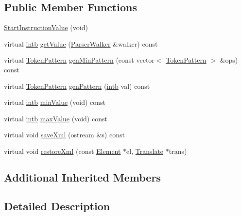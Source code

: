\subsection*{Public Member Functions}
\begin{DoxyCompactItemize}
\item 
\mbox{\hyperlink{class_start_instruction_value_a664ffdbfc8c447d445d24350a67a02b3}{Start\+Instruction\+Value}} (void)
\item 
virtual \mbox{\hyperlink{types_8h_aa925ba3e627c2df89d5b1cfe84fb8572}{intb}} \mbox{\hyperlink{class_start_instruction_value_a3f4a8c25d278300066291616f10c355b}{get\+Value}} (\mbox{\hyperlink{class_parser_walker}{Parser\+Walker}} \&walker) const
\item 
virtual \mbox{\hyperlink{class_token_pattern}{Token\+Pattern}} \mbox{\hyperlink{class_start_instruction_value_afb0f9fba5d65119bdd04e4507630f77f}{gen\+Min\+Pattern}} (const vector$<$ \mbox{\hyperlink{class_token_pattern}{Token\+Pattern}} $>$ \&ops) const
\item 
virtual \mbox{\hyperlink{class_token_pattern}{Token\+Pattern}} \mbox{\hyperlink{class_start_instruction_value_a58682ad2f7b1925cce6e70df51727fad}{gen\+Pattern}} (\mbox{\hyperlink{types_8h_aa925ba3e627c2df89d5b1cfe84fb8572}{intb}} val) const
\item 
virtual \mbox{\hyperlink{types_8h_aa925ba3e627c2df89d5b1cfe84fb8572}{intb}} \mbox{\hyperlink{class_start_instruction_value_a3bb03f2948fdb225bbd97607915829bd}{min\+Value}} (void) const
\item 
virtual \mbox{\hyperlink{types_8h_aa925ba3e627c2df89d5b1cfe84fb8572}{intb}} \mbox{\hyperlink{class_start_instruction_value_a87c142a7b212a8b68e7ca1f9ad3f9ede}{max\+Value}} (void) const
\item 
virtual void \mbox{\hyperlink{class_start_instruction_value_a4f78823c397837aff8eb30d41fa68149}{save\+Xml}} (ostream \&s) const
\item 
virtual void \mbox{\hyperlink{class_start_instruction_value_a3b8738c1509a0e0ee7a373f3c4f22653}{restore\+Xml}} (const \mbox{\hyperlink{class_element}{Element}} $\ast$el, \mbox{\hyperlink{class_translate}{Translate}} $\ast$trans)
\end{DoxyCompactItemize}
\subsection*{Additional Inherited Members}


\subsection{Detailed Description}


